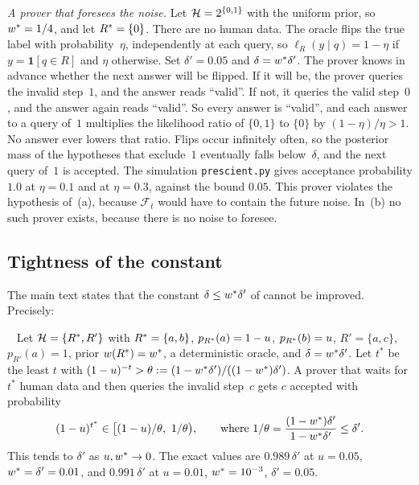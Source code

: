 \emph{A prover that foresees the noise.} Let $\mathcal{H}=2^{\{0,1\}}$ with the uniform prior, so $w^{*}=1/4$, and let $R^{*}=\{0\}$. There are no human data. The oracle flips the true label with probability~$\eta$, independently at each query, so $\ell_R(y\mid q)=1-\eta$ if $y=\mathbf 1[q\in R]$ and $\eta$ otherwise. Set $\delta'=0.05$ and $\delta=w^{*}\delta'$. The prover knows in advance whether the next answer will be flipped. If it will be, the prover queries the invalid step~$1$, and the answer reads ``valid''. If not, it queries the valid step~$0$, and the answer again reads ``valid''. So every answer is ``valid'', and each answer to a query of~$1$ multiplies the likelihood ratio of $\{0,1\}$ to $\{0\}$ by $(1-\eta)/\eta>1$. No answer ever lowers that ratio. Flips occur infinitely often, so the posterior mass of the hypotheses that exclude~$1$ eventually falls below~$\delta$, and the next query of~$1$ is accepted. The simulation \texttt{prescient.py} gives acceptance probability $1.0$ at $\eta=0.1$ and at $\eta=0.3$, against the bound $0.05$. This prover violates the hypothesis of~(a), because $\mathcal F_t$ would have to contain the future noise. In~(b) no such prover exists, because there is no noise to foresee.

\subsection{Tightness of the constant}\label{app:caution:tight}

The main text states that the constant $\delta\le w^{*}\delta'$ of  cannot be improved. Precisely:

\begin{proposition}\ \label{prop:caution:tight}
Let $\mathcal{H}=\{R^{*},R'\}$ with $R^{*}=\{a,b\}$, $p_{R^{*}}(a)=1-u$, $p_{R^{*}}(b)=u$, $R'=\{a,c\}$, $p_{R'}(a)=1$, prior $w(R^{*})=w^{*}$, a deterministic oracle, and $\delta=w^{*}\delta'$. Let $t^*$ be the least $t$ with $(1-u)^{-t}>\theta:=(1-w^{*}\delta')/((1-w^{*})\delta')$. A prover that waits for $t^*$ human data and then queries the invalid step~$c$ gets $c$ accepted with probability
\[
(1-u)^{t^*}\in\big[(1-u)/\theta,\ 1/\theta\big),\qquad\text{where } 1/\theta=\frac{(1-\wstar)\delta'}{1-\wstar\delta'}\le\delta'.
\]
This tends to $\delta'$ as $u,w^{*}\to0$. The exact values are $0.989\,\delta'$ at $u=0.05$, $w^{*}=\delta'=0.01$, and $0.991\,\delta'$ at $u=0.01$, $w^{*}=10^{-3}$, $\delta'=0.05$.
\end{proposition}

